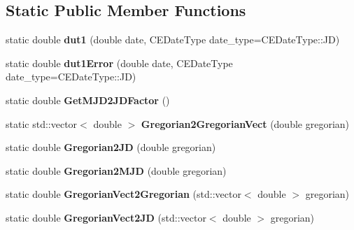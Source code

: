 \subsection*{Static Public Member Functions}
\begin{DoxyCompactItemize}
\item 
\hypertarget{class_c_e_date_a48ed1e949856bdc1f735d5682ad90b13}{}static double {\bfseries dut1} (double date, C\+E\+Date\+Type date\+\_\+type=C\+E\+Date\+Type\+::\+J\+D)\label{class_c_e_date_a48ed1e949856bdc1f735d5682ad90b13}

\item 
\hypertarget{class_c_e_date_a3b7b48a1fb897f1a97650551a56ea74e}{}static double {\bfseries dut1\+Error} (double date, C\+E\+Date\+Type date\+\_\+type=C\+E\+Date\+Type\+::\+J\+D)\label{class_c_e_date_a3b7b48a1fb897f1a97650551a56ea74e}

\item 
\hypertarget{class_c_e_date_ad3e980e8803ecc0671222ba662bdc7d8}{}static double {\bfseries Get\+M\+J\+D2\+J\+D\+Factor} ()\label{class_c_e_date_ad3e980e8803ecc0671222ba662bdc7d8}

\item 
\hypertarget{class_c_e_date_a0d1bc6ed26cc38c4bbbe22953a9eb5bf}{}static std\+::vector$<$ double $>$ {\bfseries Gregorian2\+Gregorian\+Vect} (double gregorian)\label{class_c_e_date_a0d1bc6ed26cc38c4bbbe22953a9eb5bf}

\item 
\hypertarget{class_c_e_date_ae9fd46001251867c9f5cf936b18ba629}{}static double {\bfseries Gregorian2\+J\+D} (double gregorian)\label{class_c_e_date_ae9fd46001251867c9f5cf936b18ba629}

\item 
\hypertarget{class_c_e_date_ab9928a115235a59b2e4c210922bd3a86}{}static double {\bfseries Gregorian2\+M\+J\+D} (double gregorian)\label{class_c_e_date_ab9928a115235a59b2e4c210922bd3a86}

\item 
\hypertarget{class_c_e_date_aa0fcbac9957aeb66d1fad1008ccdbac3}{}static double {\bfseries Gregorian\+Vect2\+Gregorian} (std\+::vector$<$ double $>$ gregorian)\label{class_c_e_date_aa0fcbac9957aeb66d1fad1008ccdbac3}

\item 
\hypertarget{class_c_e_date_aea89e8524c94bcfa9d1a352ec437f084}{}static double {\bfseries Gregorian\+Vect2\+J\+D} (std\+::vector$<$ double $>$ gregorian)\label{class_c_e_date_aea89e8524c94bcfa9d1a352ec437f084}


\end{DoxyCompactItemize}
